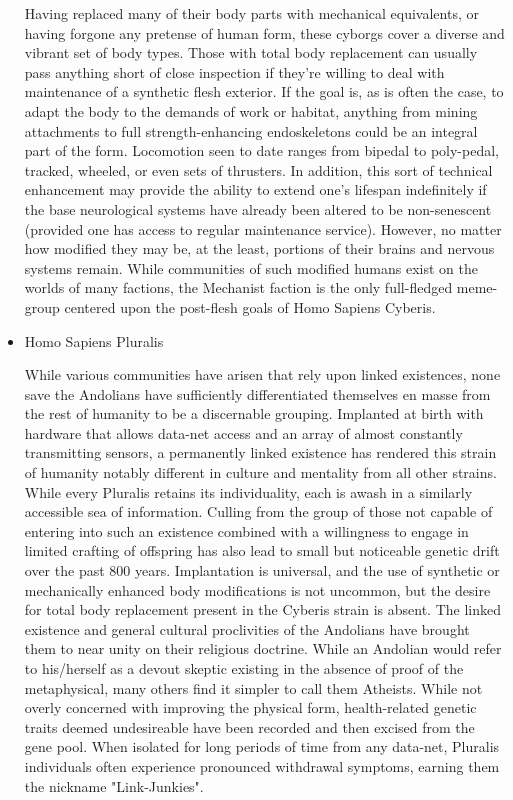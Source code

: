 \begin{itemize}
Having replaced many of their body parts with mechanical equivalents,
or having forgone any pretense of human form, these cyborgs cover a
diverse and vibrant set of body types. Those with total body
replacement can usually pass anything short of close inspection if
they're willing to deal with maintenance of a synthetic flesh
exterior. If the goal is, as is often the case, to adapt the body to
the demands of work or habitat, anything from mining attachments to
full strength-enhancing endoskeletons could be an integral part of the
form. Locomotion seen to date ranges from bipedal to poly-pedal,
tracked, wheeled, or even sets of thrusters. In addition, this sort of
technical enhancement may provide the ability to extend one's lifespan
indefinitely if the base neurological systems have already been
altered to be non-senescent (provided one has access to regular
maintenance service). However, no matter how modified they may be, at
the least, portions of their brains and nervous systems remain.  While
communities of such modified humans exist on the worlds of many
factions, the Mechanist faction is the only full-fledged meme-group
centered upon the post-flesh goals of Homo Sapiens Cyberis.

\item Homo Sapiens Pluralis

While various communities have arisen that rely upon linked
existences, none save the Andolians have sufficiently differentiated
themselves en masse from the rest of humanity to be a discernable
grouping. Implanted at birth with hardware that allows data-net access
and an array of almost constantly transmitting sensors, a permanently
linked existence has rendered this strain of humanity notably
different in culture and mentality from all other strains.  While
every Pluralis retains its individuality, each is awash in a similarly
accessible sea of information. Culling from the group of those not
capable of entering into such an existence combined with a willingness
to engage in limited crafting of offspring has also lead to small but
noticeable genetic drift over the past 800 years. Implantation is
universal, and the use of synthetic or mechanically enhanced body
modifications is not uncommon, but the desire for total body
replacement present in the Cyberis strain is absent.  The linked
existence and general cultural proclivities of the Andolians have
brought them to near unity on their religious doctrine. While an
Andolian would refer to his/herself as a devout skeptic existing in
the absence of proof of the metaphysical, many others find it simpler
to call them Atheists.  While not overly concerned with improving the
physical form, health-related genetic traits deemed undesireable have
been recorded and then excised from the gene pool. When isolated for
long periods of time from any data-net, Pluralis individuals often
experience pronounced withdrawal symptoms, earning them the nickname
"Link-Junkies".


\end{itemize}
